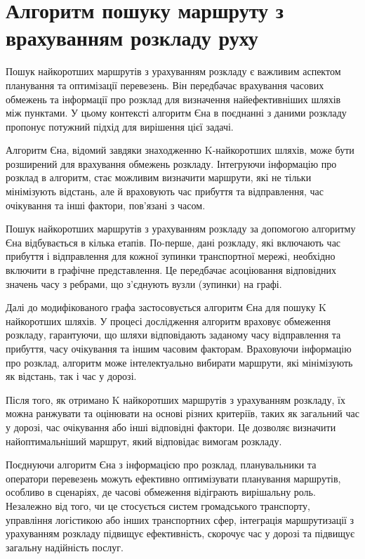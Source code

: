 \section{Алгоритм пошуку маршруту з врахуванням розкладу руху}
\label{sec:clients-analysis}

Пошук найкоротших маршрутів з урахуванням розкладу є важливим аспектом планування та оптимізації перевезень. Він передбачає врахування часових обмежень та інформації про розклад для визначення найефективніших шляхів між пунктами. У цьому контексті алгоритм Єна в поєднанні з даними розкладу пропонує потужний підхід для вирішення цієї задачі.

Алгоритм Єна, відомий завдяки знаходженню K-найкоротших шляхів, може бути розширений для врахування обмежень розкладу. Інтегруючи інформацію про розклад в алгоритм, стає можливим визначити маршрути, які не тільки мінімізують відстань, але й враховують час прибуття та відправлення, час очікування та інші фактори, пов'язані з часом.

Пошук найкоротших маршрутів з урахуванням розкладу за допомогою алгоритму Єна відбувається в кілька етапів. По-перше, дані розкладу, які включають час прибуття і відправлення для кожної зупинки транспортної мережі, необхідно включити в графічне представлення. Це передбачає асоціювання відповідних значень часу з ребрами, що з'єднують вузли (зупинки) на графі.

Далі до модифікованого графа застосовується алгоритм Єна для пошуку K найкоротших шляхів. У процесі дослідження алгоритм враховує обмеження розкладу, гарантуючи, що шляхи відповідають заданому часу відправлення та прибуття, часу очікування та іншим часовим факторам. Враховуючи інформацію про розклад, алгоритм може інтелектуально вибирати маршрути, які мінімізують як відстань, так і час у дорозі.

Після того, як отримано K найкоротших маршрутів з урахуванням розкладу, їх можна ранжувати та оцінювати на основі різних критеріїв, таких як загальний час у дорозі, час очікування або інші відповідні фактори. Це дозволяє визначити найоптимальніший маршрут, який відповідає вимогам розкладу.

Поєднуючи алгоритм Єна з інформацією про розклад, планувальники та оператори перевезень можуть ефективно оптимізувати планування маршрутів, особливо в сценаріях, де часові обмеження відіграють вирішальну роль. Незалежно від того, чи це стосується систем громадського транспорту, управління логістикою або інших транспортних сфер, інтеграція маршрутизації з урахуванням розкладу підвищує ефективність, скорочує час у дорозі та підвищує загальну надійність послуг.

